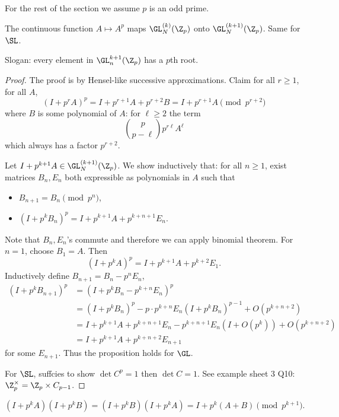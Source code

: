\documentclass[a4paper]{article}
\begin{document}
For the rest of the section we assume \(p\) is an odd prime.

\begin{proposition}
  The continuous function \(A \mapsto A^p\) maps \(\GL_N^{(k)}(\Z_p)\) onto \(\GL_N^{(k + 1)}(\Z_p)\). Same for \(\SL\).
\end{proposition}

Slogan: every element in \(\GL_n^{k + 1}(\Z_p)\) has a \(p\)th root.

\begin{proof}
  The proof is by Hensel-like successive approximations. Claim for all \(r \geq 1\), for all \(A\),
  \[
    (I + p^rA)^p
    = I + p^{r + 1}A + p^{r + 2}B
    = I + p^{r + 1}A \pmod{p^{r + 2}}
  \]
  where \(B\) is some polynomial of \(A\): for \(\ell \geq 2\) the term
  \[
    \binom{p}{p - \ell} p^{r\ell} A^{\ell}
  \]
  which always has a factor \(p^{r + 2}\).

  Let \(I + p^{k + 1}A \in \GL_N^{(k + 1)}(\Z_p)\). We show inductively that: for all \(n \geq 1\), exist matrices \(B_n, E_n\) both expressible as polynomials in \(A\) such that
  \begin{itemize}
  \item \(B_{n + 1} = B_n \pmod{p^n}\),
  \item \((I + p^k B_n)^p = I + p^{k + 1}A + p^{k + n + 1}E_n\).
  \end{itemize}
  Note that \(B_n, E_n\)'s commute and therefore we can apply binomial theorem. For \(n = 1\), choose \(B_1 = A\). Then
  \[
    (I + p^kA)^p = I + p^{k + 1}A + p^{k + 2}E_1.
  \]
  Inductively define \(B_{n + 1} = B_n - p^n E_n\),
  \begin{align*}
    (I + p^k B_{n + 1})^p
    &= (I + p^k B_n - p^{k + n}E_n)^p \\
    &= (I + p^kB_n)^p - p \cdot p^{k + n} E_n (I + p^k B_n)^{p - 1} + O(p^{k + n + 2}) \\
    &= I + p^{k + 1}A + p^{k + n + 1}E_n - p^{k + n + 1} E_n (I + O(p^k)) + O(p^{k + n + 2}) \\
    &= I + p^{k + 1}A + p^{k + n + 2}E_{n + 1}
  \end{align*}
  for some \(E_{n + 1}\). Thus the proposition holds for \(\GL\).

  For \(\SL\), suffcies to show \(\det C^p = 1\) then \(\det C = 1\). See example sheet 3 Q10: \(\Z_p^\times = \Z_p \times C_{p - 1}\).
\end{proof}

\begin{lemma}
  \[
    (I + p^kA)(I + p^kB) = (I + p^k B)(I + p^kA) = I + p^k(A + B) \pmod{p^{k + 1}}.
  \]
\end{lemma}
\end{document}
